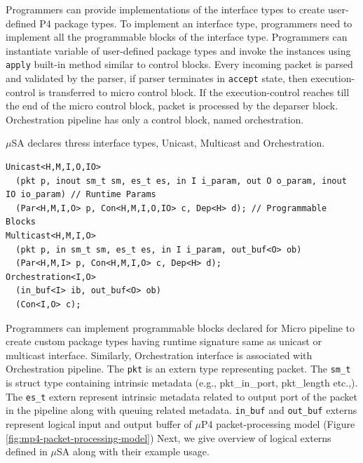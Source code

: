 Programmers can provide implementations of the interface types to create user-defined P4 package types.
To implement an interface type, programmers need to implement all the programmable blocks of the interface type.
Programmers can instantiate variable of user-defined package types and invoke the instances using \texttt{apply} built-in method similar to control blocks.
Every incoming packet is parsed and validated by the parser, if parser terminates in \texttt{accept} state, then execution-control is transferred to micro control block.
If the execution-control reaches till the end of the micro control block, packet is processed by the deparser block.
Orchestration pipeline has only a control block, named orchestration.

$\mu$SA declares thress interface types, Unicast, Multicast and Orchestration.
\begin{lstlisting}[frame=none]
Unicast<H,M,I,O,IO>
  (pkt p, inout sm_t sm, es_t es, in I i_param, out O o_param, inout IO io_param) // Runtime Params
  (Par<H,M,I,O> p, Con<H,M,I,O,IO> c, Dep<H> d); // Programmable Blocks
Multicast<H,M,I,O>
  (pkt p, in sm_t sm, es_t es, in I i_param, out_buf<O> ob)
  (Par<H,M,I> p, Con<H,M,I,O> c, Dep<H> d); 
Orchestration<I,O>
  (in_buf<I> ib, out_buf<O> ob)
  (Con<I,O> c);
\end{lstlisting}
Programmers can implement programmable blocks declared for Micro pipeline to create custom package types having runtime signature same as unicast or multicast interface.
Similarly, Orchestration interface is associated with Orchestration pipeline.
The \texttt{pkt} is an extern type representing packet. 
The \texttt{sm\_t} is struct type containing intrinsic metadata (e.g., pkt\_in\_port, pkt\_length etc.,).
The \texttt{es\_t} extern represent intrinsic metadata related to output port of the packet in the pipeline along with queuing related metadata.
\texttt{in\_buf} and \texttt{out\_buf} externs represent logical input and output buffer of $\mu$P4 packet-processing model (Figure \ref{fig:mp4-packet-processing-model})
Next, we give overview of logical externs defined in $\mu$SA along with their example usage.



